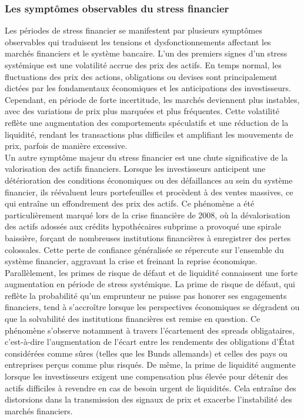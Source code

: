 \subsubsection{Les symptômes observables du stress financier}

Les périodes de stress financier se manifestent par plusieurs symptômes observables qui traduisent les tensions et dysfonctionnements affectant les marchés financiers et le système bancaire. L’un des premiers signes d’un stress systémique est une volatilité accrue des prix des actifs. En temps normal, les fluctuations des prix des actions, obligations ou devises sont principalement dictées par les fondamentaux économiques et les anticipations des investisseurs. Cependant, en période de forte incertitude, les marchés deviennent plus instables, avec des variations de prix plus marquées et plus fréquentes. Cette volatilité reflète une augmentation des comportements spéculatifs et une réduction de la liquidité, rendant les transactions plus difficiles et amplifiant les mouvements de prix, parfois de manière excessive.\\

Un autre symptôme majeur du stress financier est une chute significative de la valorisation des actifs financiers. Lorsque les investisseurs anticipent une détérioration des conditions économiques ou des défaillances au sein du système financier, ils réévaluent leurs portefeuilles et procèdent à des ventes massives, ce qui entraîne un effondrement des prix des actifs. Ce phénomène a été particulièrement marqué lors de la crise financière de 2008, où la dévalorisation des actifs adossés aux crédits hypothécaires subprime a provoqué une spirale baissière, forçant de nombreuses institutions financières à enregistrer des pertes colossales. Cette perte de confiance généralisée se répercute sur l’ensemble du système financier, aggravant la crise et freinant la reprise économique.\\

Parallèlement, les primes de risque de défaut et de liquidité connaissent une forte augmentation en période de stress systémique. La prime de risque de défaut, qui reflète la probabilité qu’un emprunteur ne puisse pas honorer ses engagements financiers, tend à s’accroître lorsque les perspectives économiques se dégradent ou que la solvabilité des institutions financières est remise en question. Ce phénomène s’observe notamment à travers l’écartement des spreads obligataires, c’est-à-dire l’augmentation de l’écart entre les rendements des obligations d’État considérées comme sûres (telles que les Bunds allemands) et celles des pays ou entreprises perçus comme plus risqués. De même, la prime de liquidité augmente lorsque les investisseurs exigent une compensation plus élevée pour détenir des actifs difficiles à revendre en cas de besoin urgent de liquidités. Cela entraîne des distorsions dans la transmission des signaux de prix et exacerbe l’instabilité des marchés financiers.\\


